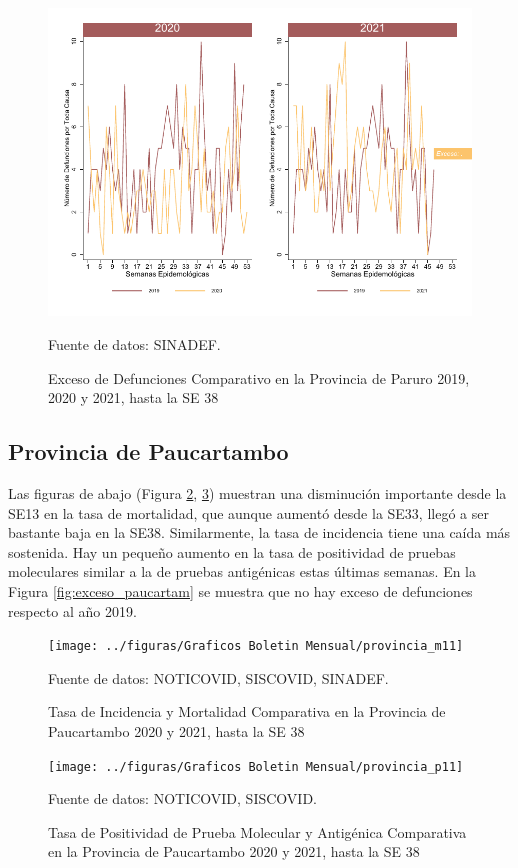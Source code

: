 \documentclass[12pt,a4paper,openany]{book}
\begin{document}
	\begin{figure}[h]
	\caption{Exceso de Defunciones Comparativo en la Provincia de Paruro 2019, 2020 y 2021, hasta la SE 38}\label{fig:exceso_paruro}
	\begin{center}
		\includegraphics[width=0.7\linewidth]{../figuras/exceso_10}
	\end{center}
	{\footnotesize {Fuente de datos: SINADEF.}}
	\end{figure}


\clearpage

	\subsection*{Provincia de Paucartambo}
	\noindent Las figuras de abajo (Figura \ref{fig:inc_mort_paucartam}, \ref{fig:positividad_paucartam})  muestran una disminución importante desde la SE13 en la tasa de mortalidad, que aunque aumentó desde la SE33, llegó a ser bastante baja en la SE38. Similarmente, la tasa de incidencia tiene una caída más sostenida. Hay un pequeño aumento en la tasa de positividad de pruebas moleculares similar a la de pruebas antigénicas estas últimas semanas. En la Figura \ref{fig:exceso_paucartam} se muestra que no hay exceso de defunciones respecto al año 2019.

	\begin{figure}[h]
	\caption{Tasa de Incidencia y Mortalidad Comparativa en la Provincia de Paucartambo 2020 y 2021, hasta la SE 38}\label{fig:inc_mort_paucartam}
	\begin{center}
		\texttt{[image: ../figuras/Graficos Boletin Mensual/provincia\_m11]}
	\end{center}
	{\footnotesize {Fuente de datos: NOTICOVID, SISCOVID, SINADEF.}}
	\end{figure}

	\begin{figure}[h]
	\caption{Tasa de Positividad de Prueba Molecular y Antigénica Comparativa en la Provincia de Paucartambo 2020 y 2021, hasta la SE 38}\label{fig:positividad_paucartam}
	\begin{center}
		\texttt{[image: ../figuras/Graficos Boletin Mensual/provincia\_p11]}
	\end{center}
	{\footnotesize {Fuente de datos: NOTICOVID, SISCOVID.}}
	\end{figure}
\end{document}
